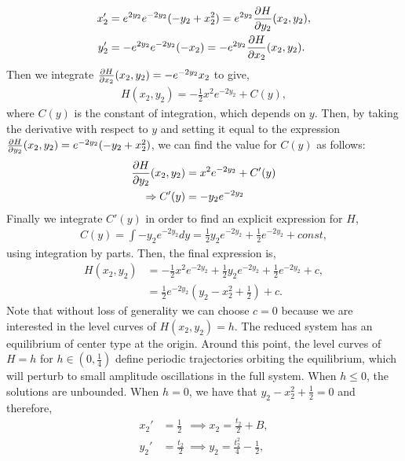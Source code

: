 \begin{align}
x_2' &=e^{2y_2}e^{-2y_2}( -y_2 +x_2^2 ) =e^{2y_2}\pd{H}{y_2}(x_2,y_2), \\
y_2' &= - e^{2y_2}e^{-2y_2}(-  x_2)=-e^{2y_2}\pd{H}{x_2}(x_2,y_2).
\end{align}
Then we integrate $ \pd{H}{x_2}(x_2,y_2) = -e^{-2y_2} x_2  $ to give,
\begin{align*}
 H(x_2,y_2) = - \frac{1}{2} x^2 e^{-2y_2} + C(y),
\end{align*}
where $C(y)$ is the constant of integration, which depends on $y$.
Then, by taking the derivative with respect to $y$ and setting it equal to the expression $\pd{H}{y_2}(x_2,y_2)=e^{-2y_2}( -y_2 +x_2^2 )$, we can find the value for $C(y)$ as follows: 
\begin{align*}
\pd{H}{y_2}(x_2,y_2)&= x^2 e^{-2y_2} + C'(y)\\
\Rightarrow C'(y) &= - y_2 e^{-2y_2}
\end{align*}
Finally we integrate $C'(y)$ in order to find an explicit expression for $H$,
\begin{align*}
C(y) = \int - y_2 e^{-2y_2} dy = \frac{1}{2} y_2 e^{-2y_2} + \frac{1}{2} e^{-2y_2} + const,
\end{align*}
using integration by parts.
Then, the final expression is,
\begin{align}
H(x_2,y_2)&=- \frac{1}{2} x^2 e^{-2y_2} + \frac{1}{2} y_2 e^{-2y_2} + \frac{1}{2} e^{-2y_2} + c,\\
&= \frac{1}{2}e^{-2y_2}\left(y_2-x^2_2+\frac{1}{2}\right) +c. \label{eq: const of motion}
\end{align}
Note that without loss of generality we can choose $c=0$ because we are interested in the level curves of $H(x_2,y_2)=h$. The reduced system has an equilibrium of center type at the origin. Around this point, the level curves of $H=h$ for $h \in (0,\frac{1}{4})$ define periodic trajectories orbiting the equilibrium, which will perturb to small amplitude oscillations in the full system. When $h\leq0$, the solutions are unbounded. When $h=0$, we have that $y_2-x_2^2+\frac{1}{2}=0$ and therefore,
\begin{subequations}
	\begin{align}
	x_2'&=\frac{1}{2}\ \	\implies x_2=\frac{t_2}{2}+B, \label{canard: trajectory x}\\
	y_2'&=\frac{t_2}{2}\ \implies y_2=\frac{t_2^2}{4}-\frac{1}{2}, \label{canard: trajectory y}
	\end{align}
	\label{canard: trajectory xy}
\end{subequations} 

